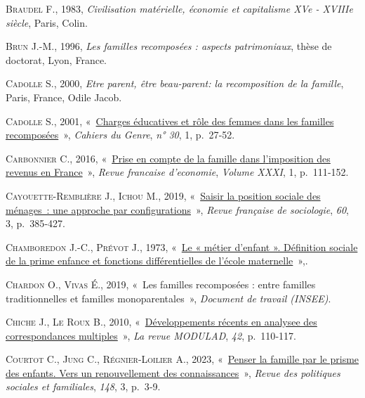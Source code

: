 \documentclass[
  12pt,
]{book}
\newlength{\cslhangindent}
\newenvironment{CSLReferences}[2] %
 {\begin{list}{}{%
  \setlength{\itemindent}{0pt}
  \setlength{\leftmargin}{0pt}
  \setlength{\parsep}{0pt}
  \ifodd #1
   \setlength{\leftmargin}{\cslhangindent}
   \setlength{\itemindent}{-1\cslhangindent}
  \fi
  \setlength{\itemsep}{#2\baselineskip}}}
 {\end{list}}
\begin{document}
\begin{CSLReferences}{0}{1}
\textsc{Braudel F.}, 1983, \emph{Civilisation matérielle, économie et
capitalisme XVe - XVIIIe siècle}, Paris, Colin.

\textsc{Brun J.-M.}, 1996, \emph{Les familles recomposées : aspects
patrimoniaux}, thèse de doctorat, Lyon, France.

\textsc{Cadolle S.}, 2000, \emph{Etre parent, être beau-parent: la
recomposition de la famille}, Paris, France, Odile Jacob.

\textsc{Cadolle S.}, 2001,
{«~\href{http://www.cairn.info/revue-cahiers-du-genre-2001-1-page-27.htm}{Charges
éducatives et rôle des femmes dans les familles recomposées}~»},
\emph{Cahiers du Genre}, \emph{n° 30}, 1, p.~27‑52.

\textsc{Carbonnier C.}, 2016,
{«~\href{https://www.cairn.info/revue-francaise-d-economie-2016-1-page-111.htm}{Prise
en compte de la famille dans l{'}imposition des revenus en France}~»},
\emph{Revue francaise d'economie}, \emph{Volume XXXI}, 1, p.~111‑152.

\textsc{Cayouette-Remblière J.}, \textsc{Ichou M.}, 2019,
{«~\href{https://doi.org/10.3917/rfs.603.0385}{Saisir la position
sociale des ménages~: une approche par configurations}~»}, \emph{Revue
française de sociologie}, \emph{60}, 3, p.~385‑427.

\textsc{Chamboredon J.-C.}, \textsc{Prévot J.}, 1973,
{«~\href{https://doi.org/10.2307/3320469}{Le « métier d'enfant ».
Définition sociale de la prime enfance et fonctions différentielles de
l'école maternelle}~»},.

\textsc{Chardon O.}, \textsc{Vivas É.}, 2019, {«~Les familles
recomposées : entre familles traditionnelles et familles
monoparentales~»}, \emph{Document de travail (INSEE)}.

\textsc{Chiche J.}, \textsc{Le Roux B.}, 2010,
{«~\href{https://hal.science/hal-00625921}{Développements récents en
analysee des correspondances multiples}~»}, \emph{La revue MODULAD},
\emph{42}, p.~110‑117.

\textsc{Courtot C.}, \textsc{Jung C.}, \textsc{Régnier-Loilier A.},
2023, {«~\href{https://doi.org/10.3917/rpsf.148.0003}{Penser la famille
par le prisme des enfants. Vers un renouvellement des connaissances}~»},
\emph{Revue des politiques sociales et familiales}, \emph{148}, 3,
p.~3‑9.


\end{CSLReferences}
\end{document}
